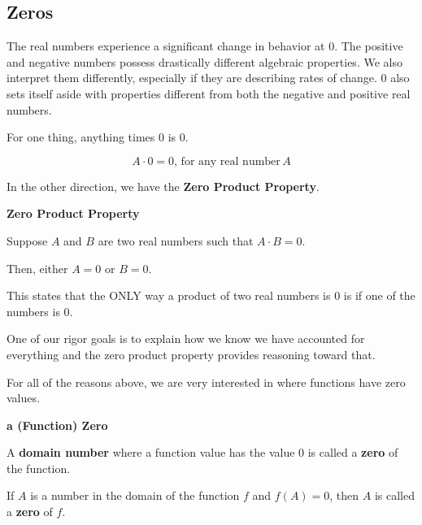 \documentclass{ximera}
\begin{document}
\subsection*{Zeros}

The real numbers experience a significant change in behavior at $0$.  The positive and negative numbers possess drastically different algebraic properties. We also interpret them differently, especially if they are describing rates of change.  $0$ also sets itself aside with properties different from both the negative and positive real numbers. 


For one thing, anything times $0$ is $0$.


\[
A \cdot 0 = 0, \, \text{for any real number} \, A
\]

In the other direction, we have the \textbf{\textcolor{purple!85!blue}{Zero Product Property}}.  








\begin{definition}  \textbf{\textcolor{green!50!black}{Zero Product Property}} 


Suppose $A$ and $B$ are two real numbers such that $A \cdot B = 0$. 


Then, either $A = 0$ or $B = 0$.




\end{definition}









This states that the ONLY way a product of two real numbers is $0$ is if one of the numbers is $0$.  

One of our rigor goals is to explain how we know we have accounted for everything and the zero product property provides reasoning toward that.

For all of the reasons above, we are very interested in where functions have zero values.






\begin{definition}  \textbf{\textcolor{green!50!black}{a (Function) Zero}} 


A \textbf{domain number} where a function value has the value $0$ is called a \textbf{zero} of the function.


\begin{center}
If $A$ is a number in the domain of the function $f$ and $f(A) = 0$, then $A$ is called a \textbf{zero} of $f$.
\end{center}


\end{definition}
\end{document}
